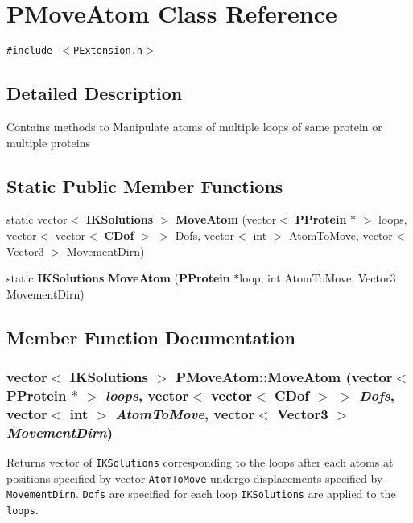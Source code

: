\section{PMove\-Atom Class Reference}
\label{classPMoveAtom}
{\tt \#include $<$PExtension.h$>$}



\subsection{Detailed Description}
Contains methods to Manipulate atoms of multiple loops of same protein or multiple proteins 

\subsection*{Static Public Member Functions}
\begin{CompactItemize}
\item 
static vector$<$ {\bf IKSolutions} $>$ {\bf Move\-Atom} (vector$<$ {\bf PProtein} $\ast$ $>$ loops, vector$<$ vector$<$ {\bf CDof} $>$ $>$ Dofs, vector$<$ int $>$ Atom\-To\-Move, vector$<$ Vector3 $>$ Movement\-Dirn)
\item 
static {\bf IKSolutions} {\bf Move\-Atom} ({\bf PProtein} $\ast$loop, int Atom\-To\-Move, Vector3 Movement\-Dirn)
\end{CompactItemize}


\subsection{Member Function Documentation}
\subsubsection{\setlength{\rightskip}{0pt plus 5cm}vector$<$ {\bf IKSolutions} $>$ PMove\-Atom::Move\-Atom (vector$<$ {\bf PProtein} $\ast$ $>$ {\em loops}, vector$<$ vector$<$ {\bf CDof} $>$ $>$ {\em Dofs}, vector$<$ int $>$ {\em Atom\-To\-Move}, vector$<$ Vector3 $>$ {\em Movement\-Dirn})\hspace{0.3cm}{\tt  [static]}}\label{classPMoveAtom_513f7e6c7221a428fff3b3a42c4d17d5}


Returns vector of {\tt IKSolutions} corresponding to the loops after each atoms at positions specified by vector {\tt Atom\-To\-Move} undergo displacements specified by {\tt Movement\-Dirn}. {\tt Dofs} are specified for each loop {\tt IKSolutions} are applied to the {\tt loops}. 
